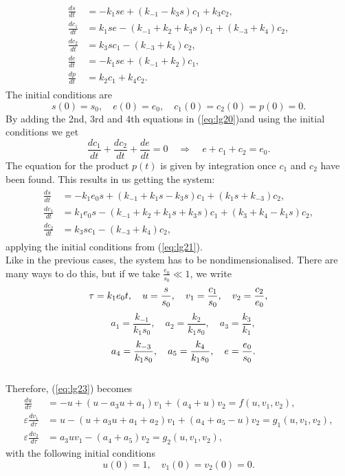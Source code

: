 \documentclass[a4paper]{report}
\theoremstyle{definition}
\begin{document}
\begin{align}
\label{eq:lg20}
\begin{split}
\frac{ds}{dt}&=-k_1se+(k_{-1}-k_3s)c_1+k_3c_2, \\
\frac{dc_1}{dt}&=k_1se-(k_{-1}+k_2+k_3s)c_1+(k_{-3}+k_4)c_2, \\
\frac{dc_2}{dt}&=k_3sc_1-(k_{-3}+k_4)c_2, \\
\frac{de}{dt}&=-k_1se+(k_{-1}+k_2)c_1, \\
\frac{dp}{dt}&=k_2c_1+k_4c_2.
\end{split}
\end{align}
The initial conditions are
\begin{equation}
\label{eq:lg21}
s(0)=s_0, \quad e(0)=e_0, \quad c_1(0)=c_2(0)=p(0)=0.
\end{equation}
By adding the 2nd, 3rd and 4th equations in (\ref{eq:lg20})and using the initial conditions we get
\begin{equation}
\label{eq:lg22}
\frac{dc_1}{dt}+\frac{dc_2}{dt}+\frac{de}{dt}=0 \quad \Rightarrow \quad
 e+c_1+c_2=e_0.
\end{equation}
The equation for the product $p(t)$ is given by integration once $c_1$ and $c_2$ have been found. This results in us getting the system:
\begin{align}
\label{eq:lg23}
\begin{split}
\frac{ds}{dt}&=-k_1e_0s+(k_{-1}+k_1s-k_3s)c_1+(k_1s+k_{-3})c_2, \\
\frac{dc_1}{dt}&=k_1e_0s-(k_{-1}+k_2+k_1s+k_3s)c_1+(k_{3}+k_4-k_1s)c_2,\\
\frac{dc_2}{dt}&=k_3sc_1-(k_{-3}+k_4)c_2,
\end{split}
\end{align}
applying the initial conditions from (\ref{eq:lg21}).
\\

Like in the previous cases, the system has to be nondimensionalised. There are many ways to do this, but if we take $\frac{e_0}{s_0}\ll 1$, we write
\begin{equation}
\tau =k_1e_0t, \quad u=\frac{s}{s_0}, \quad v_1=\frac{c_1}{s_0}, \quad v_2=\frac{c_2}{e_0}, \notag
\end{equation}
\begin{equation}
\quad a_1=\frac{k_{-1}}{k_1s_0}, \quad a_2=\frac{k_2}{k_1s_0}, \quad a_3=\frac{k_3}{k_1}, 
\end{equation}
\begin{equation}
\quad a_4=\frac{k_{-3}}{k_1s_0}, \quad a_5=\frac{k_4}{k_1s_0}, \quad e=\frac{e_0}{s_0}. \notag
\end{equation}
\\
Therefore, (\ref{eq:lg23}) becomes
\begin{align}
\label{eq:lg24}
\frac{du}{d\tau}&=-u+(u-a_3u+a_1)v_1+(a_4+u)v_2=f(u,v_1,v_2), \\
\varepsilon\frac{dv_1}{d\tau}&=u-(u+a_3u+a_1+a_2)v_1+(a_4+a_5-u)v_2=g_1(u,v_1,v_2), \\
\varepsilon\frac{dv_2}{d\tau}&=a_3uv_1-(a_4+a_5)v_2=g_2(u,v_1,v_2),
\end{align}
with the following initial conditions
\begin{equation}
\label{eq:lg25}
u(0)=1, \quad v_1(0)=v_2(0)=0.
\end{equation}
\end{document}

